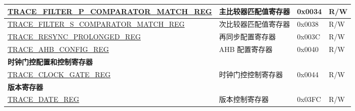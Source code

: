 \begin{longtable}{ | p{8cm} | p{6.2cm} | p{1.3cm} | p{1cm} | }
\hyperref[regdesc:TRACEFILTERPCOMPARATORMATCHREG]{TRACE\_FILTER\_P\_COMPARATOR\_MATCH\_REG} & 主比较器匹配值寄存器 & 0x0034 & R/W \\ \hline
\hyperref[regdesc:TRACEFILTERSCOMPARATORMATCHREG]{TRACE\_FILTER\_S\_COMPARATOR\_MATCH\_REG} & 次比较器匹配值寄存器 & 0x0038 & R/W \\ \hline
\hyperref[regdesc:TRACERESYNCPROLONGEDREG]{TRACE\_RESYNC\_PROLONGED\_REG} & 再同步配置寄存器 & 0x003C & R/W \\ \hline
\hyperref[regdesc:TRACEAHBCONFIGREG]{TRACE\_AHB\_CONFIG\_REG} & AHB 配置寄存器 & 0x0040 & R/W \\ \hline
\multicolumn{4}{|l|}{\textbf{时钟门控配置和控制寄存器}} \\ \hline
\hyperref[regdesc:TRACECLOCKGATEREG]{TRACE\_CLOCK\_GATE\_REG} & 时钟门控控制寄存器 & 0x0044 & R/W \\ \hline
\multicolumn{4}{|l|}{\textbf{版本寄存器}} \\ \hline
\hyperref[regdesc:TRACEDATEREG]{TRACE\_DATE\_REG} & 版本控制寄存器 & 0x03FC & R/W \\ \hline
\end{longtable}
